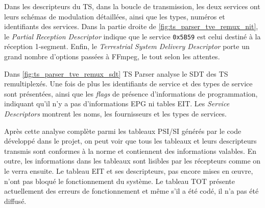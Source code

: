 \documentclass[12pt,a4paper]{article}
\begin{document}
Dans les descripteurs du TS, dans la boucle de transmission, les deux services ont leurs schémas de modulation détaillées, ainsi que les types, numéros et identifiants des services. Dans la partie droite de \autoref{fig:ts_parser_tve_remux_nit}, le \textit{Partial Reception Descriptor} indique que le service \texttt{0x5B59} est celui destiné à la réception 1-segment. Enfin, le \textit{Terrestrial System Delivery Descriptor} porte un grand nombre d'options passées à FFmpeg, le tout selon les attentes.



Dans \autoref{fig:ts_parser_tve_remux_sdt} TS Parser analyse le SDT des TS remultiplexés. Une fois de plus les identifiants de service et des types de service sont présentées, ainsi que les \textit{flags} de présence d'informations de programmation, indiquant qu'il n'y a pas d'informations EPG ni tables EIT. Les \textit{Service Descriptors} montrent les noms, les fournisseurs et les types de services.

Après cette analyse complète parmi les tableaux PSI/SI générés par le code développé dans le projet, on peut voir que tous les tableaux et leurs descripteurs transmis sont conformes à la norme et contiennent des informations valables. En outre, les informations dans les tableaux sont lisibles par les récepteurs comme on le verra ensuite. Le tableau EIT et ses descripteurs, pas encore mises en œuvre, n'ont pas bloqué le fonctionnement du système. Le tableau TOT présente actuellement des erreurs de fonctionnement et même s'il a été codé, il n'a pas été diffusé.

\end{document}
